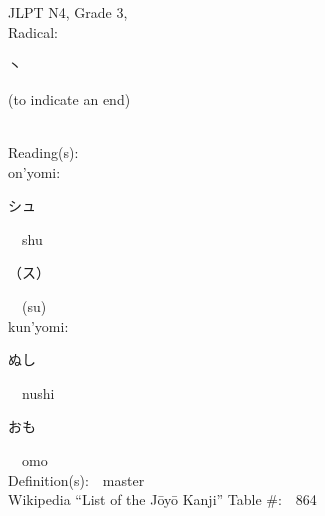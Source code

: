 \begin{multicols}{2}
{JLPT N4, Grade 3, \\Radical:\ \ {\begin{CJK}{UTF8}{min} 丶 \end{CJK}} (to indicate an end) } \\
Reading(s):\ \ \\
{\hspace*{1em}}on'yomi:\ \ \\
{\hspace*{2em}}{\begin{CJK}{UTF8}{min} シュ \end{CJK}}\ \ shu\ \ \\
{\hspace*{2em}}{\begin{CJK}{UTF8}{min} （ス） \end{CJK}}\ \ (su)\ \ \\
{\hspace*{1em}}kun'yomi:\ \ \\
{\hspace*{2em}}{\begin{CJK}{UTF8}{min} ぬし \end{CJK}}\ \ nushi\ \ \\
{\hspace*{2em}}{\begin{CJK}{UTF8}{min} おも \end{CJK}}\ \ omo\ \ \\
Definition(s):\ \ master \\
Wikipedia ``List of the J\=oy\=o Kanji'' Table \#:\ \ 864 \\
\ \ \\
\end{multicols}



